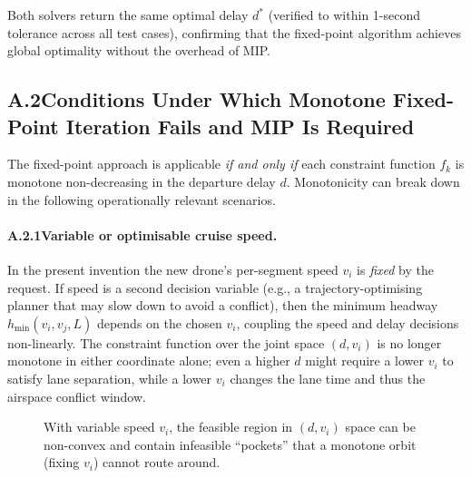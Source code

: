 \documentclass[12pt,a4paper]{article}
\begin{document}
\noindent Both solvers return the same optimal delay $d^*$ (verified to
within 1-second tolerance across all test cases), confirming that the
fixed-point algorithm achieves global optimality without the overhead of
MIP.


\subsection*{A.2\quad Conditions Under Which Monotone Fixed-Point Iteration
             Fails and MIP Is Required}

The fixed-point approach is applicable \emph{if and only if} each
constraint function $f_k$ is monotone non-decreasing in the departure
delay $d$.  Monotonicity can break down in the following operationally
relevant scenarios.

\paragraph{A.2.1\quad Variable or optimisable cruise speed.}
In the present invention the new drone's per-segment speed $v_i$ is
\emph{fixed} by the request.  If speed is a second decision variable
(e.g., a trajectory-optimising planner that may slow down to avoid a
conflict), then the minimum headway $h_{\min}(v_i, v_j, L)$ depends on
the chosen $v_i$, coupling the speed and delay decisions
non-linearly.  The constraint function over the joint space
$(d, v_i)$ is no longer monotone in either coordinate alone; even a
higher $d$ might require a lower $v_i$ to satisfy lane separation,
while a lower $v_i$ changes the lane time and thus the airspace
conflict window.

\begin{figure}[h]
\centering
{}
\caption{With variable speed $v_i$, the feasible region in $(d, v_i)$
space can be non-convex and contain infeasible ``pockets'' that a
monotone orbit (fixing $v_i$) cannot route around.}
\end{figure}
\end{document}
